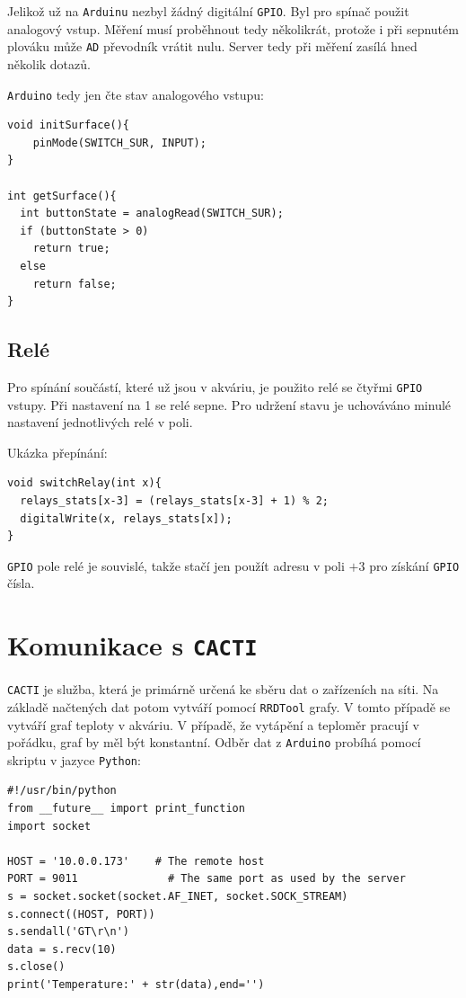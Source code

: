 \documentclass[a4paper,10pt]{article}
\newcommand{\ttt}[1]{\texttt{#1}}
\begin{document}
Jelikož už na \ttt{Arduinu} nezbyl žádný digitální \ttt{GPIO}. Byl pro spínač použit analogový vstup. Měření musí proběhnout tedy několikrát, protože i při sepnutém plováku může \ttt{AD} převodník vrátit nulu. Server tedy při měření zasílá hned několik dotazů.

\ttt{Arduino} tedy jen čte stav analogového vstupu:

\begin{verbatim}
void initSurface(){
	pinMode(SWITCH_SUR, INPUT);
}

int getSurface(){
  int buttonState = analogRead(SWITCH_SUR);
  if (buttonState > 0)
    return true;
  else
    return false;
}
\end{verbatim}

\subsection{Relé}

Pro spínání součástí, které už jsou v akváriu, je použito relé se čtyřmi \ttt{GPIO} vstupy. Při nastavení na 1 se relé sepne. Pro udržení stavu je uchováváno minulé nastavení jednotlivých relé v poli.

Ukázka přepínání:

\begin{verbatim}
void switchRelay(int x){
  relays_stats[x-3] = (relays_stats[x-3] + 1) % 2;
  digitalWrite(x, relays_stats[x]);
}
\end{verbatim}

\ttt{GPIO} pole relé je souvislé, takže stačí jen použít adresu v poli $+3$ pro získání \ttt{GPIO} čísla.

\section{Komunikace s \ttt{CACTI}}

\ttt{CACTI} je služba, která je primárně určená ke sběru dat o zařízeních na síti. Na základě načtených dat potom vytváří pomocí \ttt{RRDTool} grafy. V tomto případě se vytváří graf teploty v akváriu. V případě, že vytápění a teploměr pracují v pořádku, graf by měl být konstantní. Odběr dat z \ttt{Arduino} probíhá pomocí skriptu v jazyce \ttt{Python}:

\begin{verbatim}
#!/usr/bin/python
from __future__ import print_function
import socket

HOST = '10.0.0.173'    # The remote host
PORT = 9011              # The same port as used by the server
s = socket.socket(socket.AF_INET, socket.SOCK_STREAM)
s.connect((HOST, PORT))
s.sendall('GT\r\n')
data = s.recv(10)
s.close()
print('Temperature:' + str(data),end='')
\end{verbatim}
\end{document}
